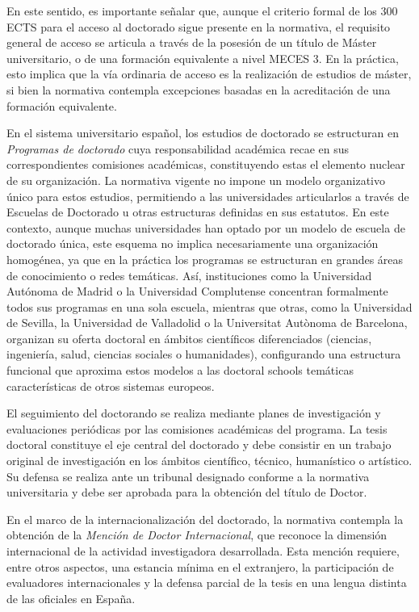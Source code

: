 \documentclass[
  11pt,
  a4paper,
  twoside]{scrreprt}
\begin{document}
En este sentido, es importante señalar que, aunque el criterio formal de
los 300 ECTS para el acceso al doctorado sigue presente en la normativa,
el requisito general de acceso se articula a través de la posesión de un
título de Máster universitario, o de una formación equivalente a nivel
MECES 3. En la práctica, esto implica que la vía ordinaria de acceso es
la realización de estudios de máster, si bien la normativa contempla
excepciones basadas en la acreditación de una formación equivalente.

En el sistema universitario español, los estudios de doctorado se
estructuran en \emph{Programas de doctorado} cuya responsabilidad
académica recae en sus correspondientes comisiones académicas,
constituyendo estas el elemento nuclear de su organización. La normativa
vigente no impone un modelo organizativo único para estos estudios,
permitiendo a las universidades articularlos a través de Escuelas de
Doctorado u otras estructuras definidas en sus estatutos. En este
contexto, aunque muchas universidades han optado por un modelo de
escuela de doctorado única, este esquema no implica necesariamente una
organización homogénea, ya que en la práctica los programas se
estructuran en grandes áreas de conocimiento o redes temáticas. Así,
instituciones como la Universidad Autónoma de Madrid o la Universidad
Complutense concentran formalmente todos sus programas en una sola
escuela, mientras que otras, como la Universidad de Sevilla, la
Universidad de Valladolid o la Universitat Autònoma de Barcelona,
organizan su oferta doctoral en ámbitos científicos diferenciados
(ciencias, ingeniería, salud, ciencias sociales o humanidades),
configurando una estructura funcional que aproxima estos modelos a las
doctoral schools temáticas características de otros sistemas europeos.

El seguimiento del doctorando se realiza mediante planes de
investigación y evaluaciones periódicas por las comisiones académicas
del programa. La tesis doctoral constituye el eje central del doctorado
y debe consistir en un trabajo original de investigación en los ámbitos
científico, técnico, humanístico o artístico. Su defensa se realiza ante
un tribunal designado conforme a la normativa universitaria y debe ser
aprobada para la obtención del título de Doctor.

En el marco de la internacionalización del doctorado, la normativa
contempla la obtención de la \emph{Mención de Doctor Internacional}, que
reconoce la dimensión internacional de la actividad investigadora
desarrollada. Esta mención requiere, entre otros aspectos, una estancia
mínima en el extranjero, la participación de evaluadores internacionales
y la defensa parcial de la tesis en una lengua distinta de las oficiales
en España.
\end{document}
